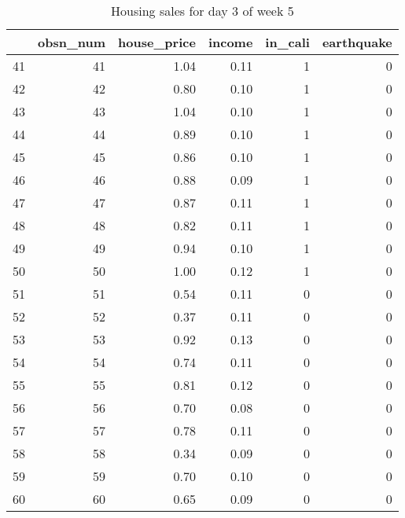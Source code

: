 \begin{table}[ht]
\centering
\begin{tabular}{rrrrrr}
  \hline
 & obsn\_num & house\_price & income & in\_cali & earthquake \\ 
  \hline
41 &  41 & 1.04 & 0.11 &   1 &   0 \\ 
  42 &  42 & 0.80 & 0.10 &   1 &   0 \\ 
  43 &  43 & 1.04 & 0.10 &   1 &   0 \\ 
  44 &  44 & 0.89 & 0.10 &   1 &   0 \\ 
  45 &  45 & 0.86 & 0.10 &   1 &   0 \\ 
  46 &  46 & 0.88 & 0.09 &   1 &   0 \\ 
  47 &  47 & 0.87 & 0.11 &   1 &   0 \\ 
  48 &  48 & 0.82 & 0.11 &   1 &   0 \\ 
  49 &  49 & 0.94 & 0.10 &   1 &   0 \\ 
  50 &  50 & 1.00 & 0.12 &   1 &   0 \\ 
  51 &  51 & 0.54 & 0.11 &   0 &   0 \\ 
  52 &  52 & 0.37 & 0.11 &   0 &   0 \\ 
  53 &  53 & 0.92 & 0.13 &   0 &   0 \\ 
  54 &  54 & 0.74 & 0.11 &   0 &   0 \\ 
  55 &  55 & 0.81 & 0.12 &   0 &   0 \\ 
  56 &  56 & 0.70 & 0.08 &   0 &   0 \\ 
  57 &  57 & 0.78 & 0.11 &   0 &   0 \\ 
  58 &  58 & 0.34 & 0.09 &   0 &   0 \\ 
  59 &  59 & 0.70 & 0.10 &   0 &   0 \\ 
  60 &  60 & 0.65 & 0.09 &   0 &   0 \\ 
   \hline
\end{tabular}
\caption{Housing sales for day 3 of week 5} 
\end{table}
